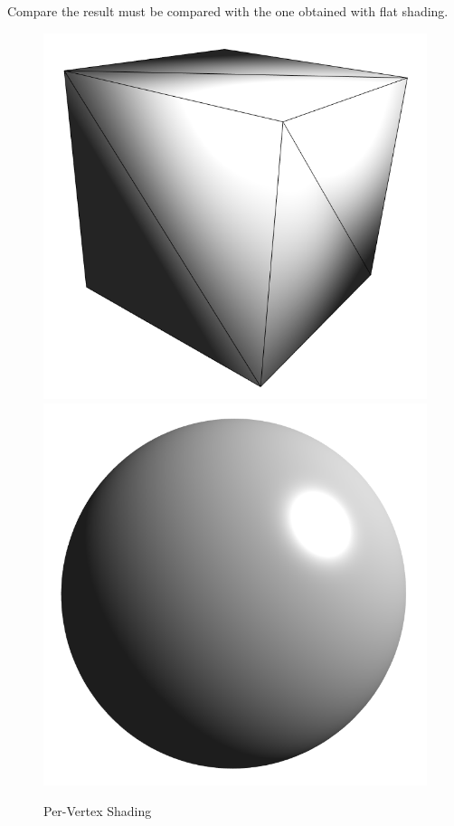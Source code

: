 \documentclass[11pt]{amsart}
\begin{document}
Compare the result must be compared with the one obtained with flat shading.
\begin{figure}[h!]
   \centering
   \includegraphics[scale=0.18]{cube_vertex.png} %
\hspace{3cm}
   \includegraphics[scale=0.18]{sphere_vertex.png} %
   \caption{Per-Vertex Shading}
   \label{fig:per_vertex_shading}
\end{figure}
\end{document}
